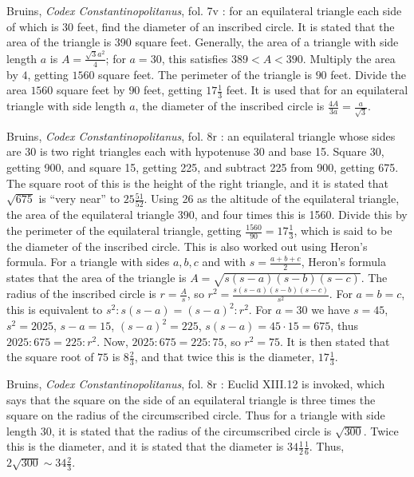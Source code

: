 \documentclass{amsart}
\theoremstyle{definition}
\begin{document}
Bruins, {\em Codex Constantinopolitanus}, fol. 7v \cite[p.~9]{constantinopolitanus}:
for an equilateral triangle each side of which is 30 feet, 
find the diameter of an inscribed circle.
It is stated that the area of the  triangle is 390 square feet.
Generally, the area of a triangle with side length $a$ is $A=\frac{\sqrt{3} a^2}{4}$; for
$a=30$, this satisfies $389<A<390$.
Multiply the area by $4$, getting $1560$ square feet. The perimeter of the triangle is 
$90$ feet. 
Divide the area $1560$ square feet by $90$ feet, getting $17 \frac{1}{3}$ feet. 
It is used that for an equilateral triangle with side length $a$, 
the diameter of the inscribed circle is
$\frac{4A}{3a} = \frac{a}{\sqrt{3}}$.

Bruins, {\em Codex Constantinopolitanus}, fol. 8r \cite[p.~10]{constantinopolitanus}:
 an equilateral triangle whose sides are 30 is  two right triangles each with hypotenuse 30 and base 15.
Square 30, getting 900, and square 15, getting 225, and subtract 225 from 900, getting 675.
The square root of this is the height of the right triangle, and it is stated that $\sqrt{675}$ is ``very near'' to
$25 \frac{51}{52}$. Using 26 as the altitude of the equilateral triangle, the area of the equilateral triangle
390, and four times this is 1560. Divide this by the perimeter of the equilateral triangle, getting $\frac{1560}{90}=17 \frac{1}{3}$,
which is said to be the diameter of the inscribed circle.
This is also worked out using Heron's formula.
For a triangle with sides $a,b,c$ and with $s=\frac{a+b+c}{2}$, Heron's formula states that the area of the triangle is 
$A=\sqrt{s(s-a)(s-b)(s-c)}$.
The radius of the inscribed circle is $r=\frac{A}{s}$, so $r^2 = \frac{s(s-a)(s-b)(s-c)}{s^2}$. 
For $a=b=c$,  this is equivalent to $s^2:s(s-a)  = (s-a)^2:r^2$. For $a=30$ we have 
$s=45$, $s^2=2025$, $s-a=15$,  $(s-a)^2=225$, $s(s-a) = 45 \cdot 15 = 675$, thus
$2025:675 = 225:r^2$. Now, $2025:675 = 225:75$, so $r^2=75$. It is then stated that the square root of $75$ is
$8 \frac{2}{3}$, and that twice this is the diameter, $17 \frac{1}{3}$. 

Bruins, {\em Codex Constantinopolitanus}, fol. 8r \cite[p.~12]{constantinopolitanus}:
Euclid XIII.12 is invoked, which says that the square on the side of an equilateral triangle is three times the square on the radius of the circumscribed circle.
Thus for a triangle with side length 30, it is stated that the radius of the circumscribed circle is $\sqrt{300}$. 
Twice this is the diameter, and it is stated that the diameter is $34 \frac{1}{2} \frac{1}{6}$. 
Thus, $2 \sqrt{300} \sim 34 \frac{2}{3}$.  
\end{document}
